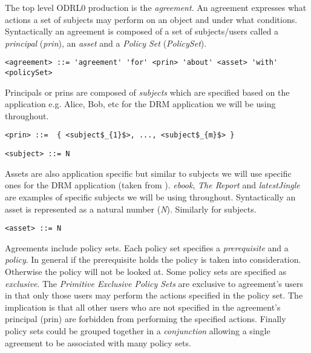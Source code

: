 The top level ODRL0 production is the \emph{agreement}. An agreement expresses what actions a set of subjects may perform on an object and under what conditions. Syntactically an agreement is composed of a set of subjects/users called a \emph{principal} (\emph{prin}), an \emph{asset} and a \emph{Policy Set} (\emph{PolicySet}).

\lstset{language=AST}
\begin{lstlisting}[frame=single, caption={agreement},label={lst:agreementast}]
<agreement> ::= 'agreement' 'for' <prin> 'about' <asset> 'with' <policySet> 
\end{lstlisting}

Principals or prins are composed of \emph{subjects} which are specified based on the application e.g. Alice, Bob, etc for the DRM application we will be using throughout.

\lstset{mathescape, language=AST}  
\begin{lstlisting}[frame=single, caption={prin},label={lst:prinast}]
<prin> ::=  { <subject$_{1}$>, ..., <subject$_{m}$> }
\end{lstlisting}

\lstset{mathescape, language=AST}  
\begin{lstlisting}[frame=single, caption={subject},label={lst:subjectast}]
<subject> ::= N
\end{lstlisting}

Assets are also application specific but similar to subjects we will use specific ones for the DRM application (taken from \cite{pucella2006}). \emph{ebook}, \emph{The Report} and \emph{latestJingle} are examples of specific subjects we will be using throughout. Syntactically an asset is represented as a natural number (\emph{N}). Similarly for subjects.

\lstset{mathescape, language=AST}  
\begin{lstlisting}[frame=single, caption={asset},label={lst:assetast}]
<asset> ::= N
\end{lstlisting}

Agreements include policy sets. Each policy set specifies a \emph{prerequisite} and a \emph{policy}. In general if the prerequisite holds the policy is taken into consideration. Otherwise the policy will not be looked at. Some policy sets are specified as \emph{exclusive}. The \emph{Primitive Exclusive Policy Sets} are exclusive to agreement's users in that only those users may perform the actions specified in the policy set. The implication is that all other users who are not specified in the agreement's principal (prin) are forbidden from performing the specified actions. Finally policy sets could be grouped together in a \emph{conjunction} allowing a single agreement to be associated with many policy sets. 



